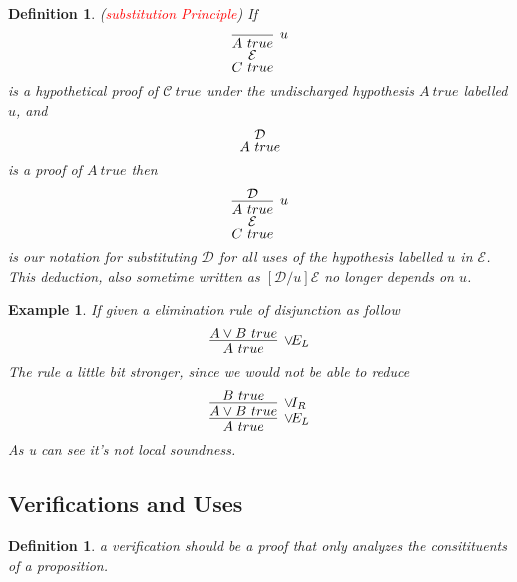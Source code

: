 \documentclass{article}
\theoremstyle{plain}
\newtheorem{example}[theorem]{Example}
\newtheorem{definition}[theorem]{Definition}
\theoremstyle{nonumberplain}
\newcommand{\redt}[1]{\textcolor{red}{#1}}
\begin{document}
\begin{definition}
\rm (\redt{substitution Principle}) If 
$$
\deduce[\mathcal{E}]{C~true}{\infer[u]{A~true}{}}
$$
is a hypothetical proof of $\mathcal{C}~true$ under the undischarged hypothesis $A~true$ labelled $u$, and 
$$
\deduce{A~true}{\mathcal{D}}
$$
is a proof of $A~true$ then
$$
\deduce[\mathcal{E}]{C~true}{\infer[u]{A~true}{\mathcal{D}}}
$$
is our notation for substituting $\mathcal{D}$ for all uses of the hypothesis labelled $u$ in $\mathcal{E}$. This deduction, also sometime written as $[\mathcal{D}/u]\mathcal{E}$ no longer depends on $u$.  
\end{definition}


\begin{example}
\rm If given a elimination rule of disjunction as follow
$$
\infer[\vee\!E_L]{A~true}{A \vee B~true}
$$
The rule a little bit stronger, since we would not be able to reduce
$$
\infer[\vee\!E_L]{A~true}{\infer[\vee\!I_R]{A \vee B~true}{B~true}}
$$
As u can see it's not local soundness. 
\end{example}







\newpage
\subsection{Verifications and Uses}

\begin{definition}
\rm a verification should be a proof that only analyzes the consitituents of a proposition.
\end{definition}
\end{document}
